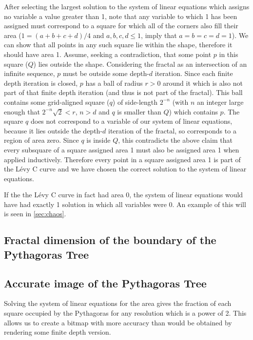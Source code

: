 \documentclass{article}
\begin{document}
After selecting the largest solution to the system of linear equations which assigns no variable a value greater than 1, note that any variable to which 1 has been assigned must correspond to a square for which all of the corners also fill their area ($1=(a+b+c+d)/4$ and $a,b,c,d\le 1$, imply that $a=b=c=d=1$). We can show that all points in any such square lie within the shape, therefore it should have area 1. Assume, seeking a contradiction, that some point $p$ in this square ($Q$) lies outside the shape. Considering the fractal as an intersection of an infinite sequence, $p$ must be outside some depth-$d$ iteration. Since each finite depth iteration is closed, $p$ has a ball of radius $r>0$ around it which is also not part of that finite depth iteration (and thus is not part of the fractal). This ball contains some grid-aligned square ($q$) of side-length $2^{-n}$ (with $n$ an integer large enough that $2^{-n}\sqrt{2}<r$, $n>d$ and $q$ is smaller than $Q$) which contains $p$. The square $q$ does not correspond to a variable of our system of linear equations, because it lies outside the depth-$d$ iteration of the fractal, so corresponds to a region of area zero. Since $q$ is inside $Q$, this contradicts the above claim that every subsquare of a square assigned area 1 must also be assigned area 1 when applied inductively. Therefore every point in a square assigned area 1 is part of the Lévy C curve and we have chosen the correct solution to the system of linear equations.

If the the Lévy C curve in fact had area 0, the system of linear equations would have had exactly 1 solution in which all variables were 0. An example of this will is seen in \ref{sec:chaos}.


\subsection{Fractal dimension of the boundary of the Pythagoras Tree}

\subsection{Accurate image of the Pythagoras Tree}
Solving the system of linear equations for the area gives the fraction of each square occupied by the Pythagoras for any resolution which is a power of 2. This allows us to create a bitmap with more accuracy than would be obtained by rendering some finite depth version.
\end{document}
